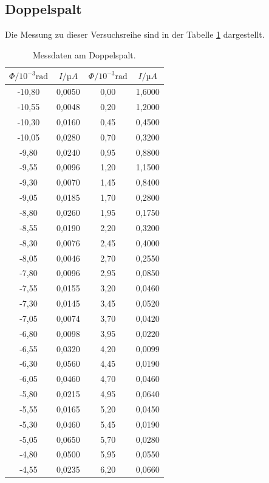 \subsection{Doppelspalt}
Die Messung zu dieser Versuchsreihe sind in der Tabelle \ref{tab:3} dargestellt.
\begin{table}[H]
  \centering
  \caption{Messdaten am Doppelspalt.}
  \label{tab:3}
  \begin{tabular}{c c c c}
    \toprule
    $\Phi / 10^{-3}\text{rad}$ & $I / µA $ &$\Phi / 10^{-3}\text{rad}$ & $I / µA$\\
    \midrule
    -10,80& 0,0050 & 0,00 & 1,6000\\
    -10,55& 0,0048 & 0,20 & 1,2000\\
    -10,30& 0,0160 & 0,45 & 0,4500\\
    -10,05& 0,0280 & 0,70 & 0,3200\\
    -9,80 & 0,0240 & 0,95 & 0,8800\\
    -9,55 & 0,0096 & 1,20 & 1,1500\\
    -9,30 & 0,0070 & 1,45 & 0,8400\\
    -9,05 & 0,0185 & 1,70 & 0,2800\\
    -8,80 & 0,0260 & 1,95 & 0,1750\\
    -8,55 & 0,0190 & 2,20 & 0,3200\\
    -8,30 & 0,0076 & 2,45 & 0,4000\\
    -8,05 & 0,0046 & 2,70 & 0,2550\\
    -7,80 & 0,0096 & 2,95 & 0,0850\\
    -7,55 & 0,0155 & 3,20 & 0,0460\\
    -7,30 & 0,0145 & 3,45 & 0,0520\\
    -7,05 & 0,0074 & 3,70 & 0,0420\\
    -6,80 & 0,0098 & 3,95 & 0,0220\\
    -6,55 & 0,0320 & 4,20 & 0,0099\\
    -6,30 & 0,0560 & 4,45 & 0,0190\\
    -6,05 & 0,0460 & 4,70 & 0,0460\\
    -5,80 & 0,0215 & 4,95 & 0,0640\\
    -5,55 & 0,0165 & 5,20 & 0,0450\\
    -5,30 & 0,0460 & 5,45 & 0,0190\\
    -5,05 & 0,0650 & 5,70 & 0,0280\\
    -4,80 & 0,0500 & 5,95 & 0,0550\\
    -4,55 & 0,0235 & 6,20 & 0,0660\\

\end{tabular}
\end{table}
